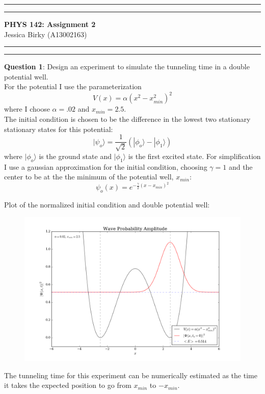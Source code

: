 \documentclass{article}
\newcommand{\mytitle}{PHYS 142: Assignment 2}
\begin{document}
\hrule \vspace{1pt} \hrule 
\begin{center}\Large \textbf{\sc \mytitle} \\
\normalsize \sc Jessica Birky (A13002163)
\end{center}
\hrule \vspace{1pt} \hrule 


\bigskip
\textbf{Question 1}: Design an experiment to simulate the tunneling time in a double potential well. \\

For the potential I use the parameterization 
\[V(x) = \alpha (x^2 - x_{min}^2)^2 \]
where I choose $\alpha = .02$ and $x_{min}=2.5$. \\ 

The initial condition is chosen to be the difference in the lowest two stationary stationary states for this potential:
\[|\psi_o\rangle = \frac{1}{\sqrt{2}} (|\phi_o\rangle - |\phi_1\rangle) \]
where $|\phi_o\rangle$ is the ground state and $|\phi_1\rangle$ is the first excited state. For simplification I use a gaussian approximation for the initial condition, choosing $\gamma = 1$ and the center to be at the the minimum of the potential well, $x_{min}$:
\[\psi_o(x) = e^{-\frac{\gamma}{2} (x-x_{min})^2} \]

Plot of the normalized initial condition and double potential well:
\begin{figure}[H]
\begin{center}
\includegraphics[width=16cm]{plots/phi_sq0.png} 
\end{center}
\end{figure}

The tunneling time for this experiment can be numerically estimated as the time it takes the expected position to go from $x_{min}$ to $-x_{min}$.
\end{document}

